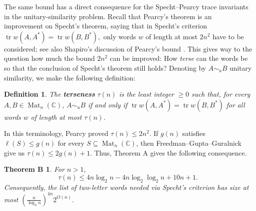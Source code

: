 \documentclass[11pt]{article}
\renewcommand{\geq}{\geqslant}
\renewcommand{\leq}{\leqslant}
\newcommand{\C}{\mathbb{C}}
\newcommand{\calL}{\mathcal{L}}
\newcommand{\usim}{\sim_u}
\DeclareMathOperator{\tr}{tr}
\newcommand{\Mat}{\operatorname{Mat}}
\newtheorem{auxiliary proposition}[theorem]{Auxiliary Proposition}
\newtheorem{definition}[theorem]{Definition}
\newtheorem{main conjecture}[theorem]{Main Conjecture}
\newtheorem{main theorem}[theorem]{Main Theorem}
\newtheorem{modesty proposition}[theorem]{Modesty Proposition}
\newtheorem{open problem}[theorem]{Open Problem}
\newtheorem{convergence lemma}[theorem]{Convergence Lemma}
\newtheorem{corrected lemma}[theorem]{Corrected Lemma}
\newtheorem{growth lemma}[theorem]{Growth Lemma}
\newtheorem{coefficient lemma}[theorem]{Integrality Lemma}
\newtheorem{interpolation lemma}[theorem]{Interpolation Lemma}
\newtheorem{kernel lemma}[theorem]{Kernel Lemma}
\newtheorem{limit lemma}[theorem]{Limit Lemma}
\newtheorem{tandem lemma}[theorem]{Modesty Lemma}
\newtheorem{zero-finding lemma}[theorem]{Zero-Finding Lemma}
\newtheorem*{theoremB}{Theorem B}
\numberwithin{equation}{section}
\begin{document}



The same bound has a direct consequence for the Specht--Pearcy trace invariants in the unitary-similarity problem.  Recall that Pearcy's theorem \cite[Theorem~1]{Pearcy1962} is an improvement on Specht's theorem,  saying that in Specht's criterion $\tr w(A,A^*)=\tr w(B,B^*),$ only words $w$ of length at most $2n^2$ have to be considered; see also Shapiro's discussion of Pearcy's bound \cite[p.~149]{Shapiro1991}. This gives way to the question how much the bound $2n^2$ can be improved: How \textit{terse} can the words be so that the conclusion of Specht's theorem still holds?
 Denoting by $A\usim B$ unitary similarity, we make the following definition:

\begin{definition}
The \textbf{terseness} $\tau(n)$ is the least integer $\geq0$ such that, for every $A,B\in\Mat_n(\C)$,  $A\usim B$ if and only if  $\tr w(A,A^*)=\tr w(B,B^*)$
for all words $w$ of length at most $\tau(n)$.
\end{definition}

In this terminology, Pearcy proved $\tau(n)\leq 2n^2$. If $g(n)$ satisfies
$\ell(S)\leq g(n)$ for every $S\subseteq\Mat_n(\C)$, then
Freedman--Gupta--Guralnick
\cite[Corollary~2.8]{FreedmanGuptaGuralnick1997} give us 
$\tau(n)\leq2g(n)+1$.  %
 Thus, Theorem A gives the following consequence.

\begin{theoremB}
For $n> 1$,
$$\tau(n)\leq4n\log_2 n-4n\log_2\log_2 n+10n+1.$$
Consequently, the list of two-letter words needed via Specht's criterion has size at most $\left(\frac{n}{\log_2 n}\right)^{4n}2^{O(n)}.$

\end{theoremB}
\end{document}
